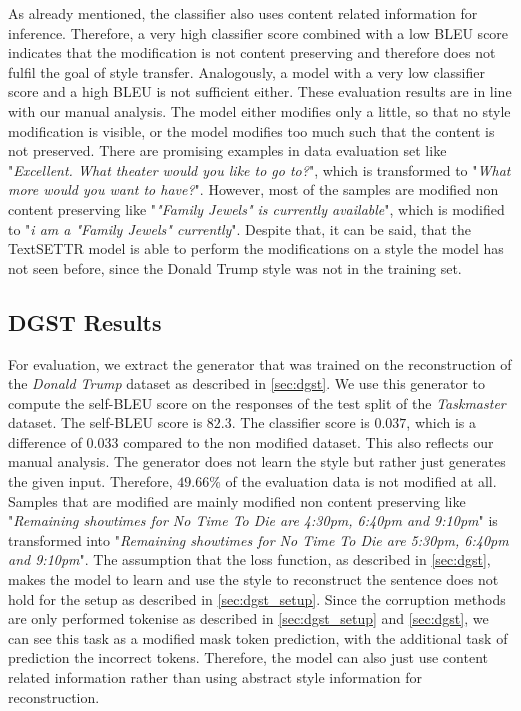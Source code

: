 \documentclass[twocolumn]{tum-article}
\begin{document}
As already mentioned, the classifier also uses content related information for inference. Therefore, a very high classifier score combined with a low BLEU score indicates that the modification is not content preserving and therefore does not fulfil the goal of style transfer. Analogously, a model with a very low classifier score and a high BLEU is not sufficient either. These evaluation results are in line with our manual analysis. The model either modifies only a little, so that no style modification is visible, or the model modifies too much such that the content is not preserved. There are promising examples in data evaluation set like "\textit{Excellent. What theater would you like to go to?}", which is transformed to "\textit{What more would you want to have?}". However, most of the samples are modified non content preserving like "\textit{"Family Jewels" is currently available}", which is modified to "\textit{i am a "Family Jewels" currently}". Despite that, it can be said, that the TextSETTR model is able to perform the modifications on a style the model has not seen before, since the Donald Trump style was not in the training set. 
\subsection{DGST Results}
For evaluation, we extract the generator that was trained on the reconstruction of the \textit{Donald Trump} dataset as described in \autoref{sec:dgst}. We use this generator to compute the self-BLEU score on the responses of the test split of the \textit{Taskmaster} dataset. The self-BLEU score is $82.3$. The classifier score is $0.037$, which is a difference of $0.033$ compared to the non modified dataset. This also reflects our manual analysis. The generator does not learn the style but rather just generates the given input. Therefore, $49.66\%$ of the evaluation data is not modified at all. Samples that are modified are mainly modified non content preserving like "\textit{Remaining showtimes for No Time To Die are 4:30pm, 6:40pm and 9:10pm}" is transformed into "\textit{Remaining showtimes for No Time To Die are 5:30pm, 6:40pm and 9:10pm}". The assumption that the loss function, as described in \autoref{sec:dgst}, makes the model to learn and use the style to reconstruct the sentence does not hold for the setup as described in \autoref{sec:dgst_setup}. Since the corruption methods are only performed tokenise as described in \autoref{sec:dgst_setup} and \autoref{sec:dgst}, we can see this task as a modified mask token prediction, with the additional task of prediction the incorrect tokens. Therefore, the model can also just use content related information rather than using abstract style information for reconstruction. 
\end{document}

